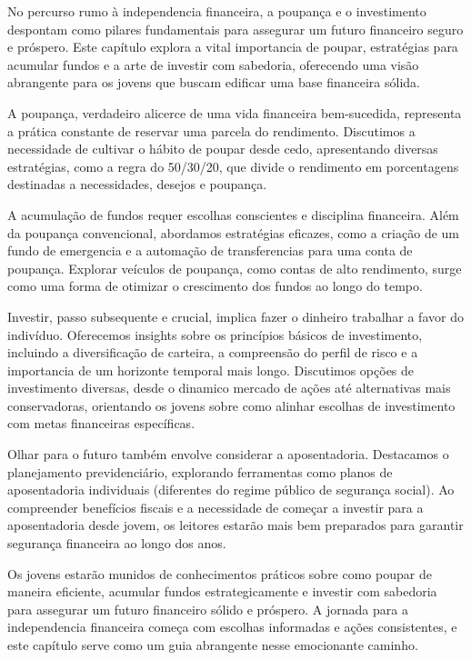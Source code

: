 \documentclass{report}
\begin{document}
No percurso rumo à independencia financeira, a poupança e o investimento despontam como pilares fundamentais para assegurar um futuro financeiro seguro e próspero. Este capítulo explora a vital importancia de poupar, estratégias para acumular fundos e a arte de investir com sabedoria, oferecendo uma visão abrangente para os jovens que buscam edificar uma base financeira sólida.

A poupança, verdadeiro alicerce de uma vida financeira bem-sucedida, representa a prática constante de reservar uma parcela do rendimento. Discutimos a necessidade de cultivar o hábito de poupar desde cedo, apresentando diversas estratégias, como a regra do 50/30/20, que divide o rendimento em porcentagens destinadas a necessidades, desejos e poupança.

A acumulação de fundos requer escolhas conscientes e disciplina financeira. Além da poupança convencional, abordamos estratégias eficazes, como a criação de um fundo de emergencia e a automação de transferencias para uma conta de poupança. Explorar veículos de poupança, como contas de alto rendimento, surge como uma forma de otimizar o crescimento dos fundos ao longo do tempo.

Investir, passo subsequente e crucial, implica fazer o dinheiro trabalhar a favor do indivíduo. Oferecemos insights sobre os princípios básicos de investimento, incluindo a diversificação de carteira, a compreensão do perfil de risco e a importancia de um horizonte temporal mais longo. Discutimos opções de investimento diversas, desde o dinamico mercado de ações até alternativas mais conservadoras, orientando os jovens sobre como alinhar escolhas de investimento com metas financeiras específicas.

Olhar para o futuro também envolve considerar a aposentadoria. Destacamos o planejamento previdenciário, explorando ferramentas como planos de aposentadoria individuais (diferentes do regime público de segurança social). Ao compreender benefícios fiscais e a necessidade de começar a investir para a aposentadoria desde jovem, os leitores estarão mais bem preparados para garantir segurança financeira ao longo dos anos.

Os jovens estarão munidos de conhecimentos práticos sobre como poupar de maneira eficiente, acumular fundos estrategicamente e investir com sabedoria para assegurar um futuro financeiro sólido e próspero. A jornada para a independencia financeira começa com escolhas informadas e ações consistentes, e este capítulo serve como um guia abrangente nesse emocionante caminho.
\end{document}
